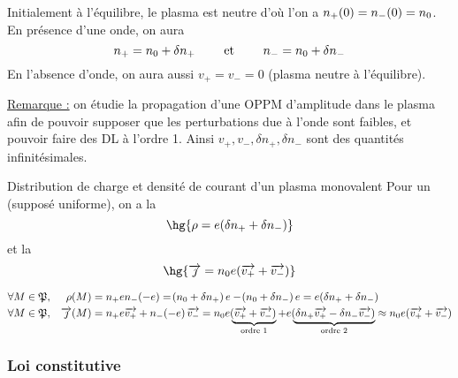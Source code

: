 \documentclass[a4paper,french,bookmarks]{book}
\begin{document}
    Initialement à l'équilibre, le plasma est neutre d'où l'on a $n_+\!\left(0\right)  = n_-\!\left(0\right) = n_0$. En présence d'une onde, on aura
    \[ n_+ = n_0 + \delta n_+ \qquad\ \text{et} \ \qquad n_- = n_0 + \delta n_-\]
    En l'absence d'onde, on aura aussi $v_+ = v_- = 0$ (plasma neutre à l'équilibre).\bigskip
    
    \underline{Remarque :} on étudie la propagation d'une OPPM d'amplitude  dans le plasma afin de pouvoir supposer que les perturbations due à l'onde sont faibles, et pouvoir faire des DL à l'ordre 1. Ainsi $v_+, v_-, \delta n_+, \delta n_-$ sont des quantités infinitésimales.
    
    \begin{property}{Distribution de charge et densité de courant d'un plasma monovalent}{}
        Pour un  (supposé uniforme), on a la 
        \[ \hg{\rho = e\p{\delta n_+ + \delta n_-}} \]
        et la 
        \[ \hg{\vec \jmath = n_0e\p{\vec{v_+} + \vec{v_-}}} \]
    \end{property}
    \begin{nproof}
        \begin{align*}
            \forall M \in \bfP,&& \rho\p{M} &= n_+e n_-\p{-e} = \p{n_0 + \delta n_+}e - \p{n_0 + \delta n_-}e = e\p{\delta n_+ + \delta n_-}\\
            \forall M \in \bfP,&& \vec \jmath \p{M} &= n_+e\vec{v_+} + n_-\p{-e}\vec{v_-} = n_0e\underbrace{\p{\vec{v_+} + \vec {v_-}}}_{\text{ordre } 1} + e\underbrace{\p{\delta n_+ \vec{v_+} - \delta n_-\vec{v_-}}}_{\text{ordre } 2} \approx n_0e\p{\vec{v_+} + \vec{v_-}}
        \end{align*}
    \end{nproof}
    
    \subsubsection*{Loi constitutive}
    
\end{document}
